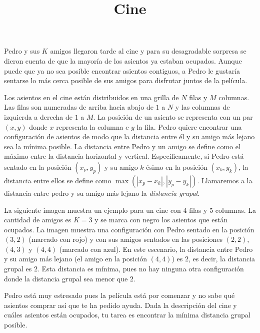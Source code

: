 \documentclass{oci}
\title{Cine}
\newcommand{\cine}{
    \fill[black] (1,3) rectangle (2,4);
    \fill[black] (2,3) rectangle (3,4);
    \fill[black] (3,3) rectangle (4,4);

    \fill[black] (0,2) rectangle (1,3);
    \fill[black] (3,2) rectangle (4,3);
    \fill[black] (4,2) rectangle (5,3);

    \fill[black] (0,1) rectangle (1,2);
    \fill[black] (1,1) rectangle (2,2);
    \fill[black] (2,1) rectangle (3,2);
    \fill[black] (4,1) rectangle (5,2);

    \fill[black] (2,0) rectangle (3,1);
    \fill[black] (4,0) rectangle (5,1);


    \foreach \x in {1, 2, 3, 4, 5} {
        \node[above] at (\x-1+0.5, 4) {\small\x};
    }
    \foreach \y in {1, 2, 3, 4} {
        \node[left] at (0, 4-\y+0.5) {\small\y};
    }
    \draw (0,0) grid (5,4);
}
\begin{document}
\begin{problemDescription}
    Pedro y sus $K$ amigos llegaron tarde al cine y
    para su desagradable sorpresa se dieron cuenta
    de que la mayoría de los asientos ya estaban ocupados.
    Aunque puede que ya no sea posible encontrar
    asientos contiguos, a Pedro le gustaría sentarse
    lo más cerca posible de sus amigos para disfrutar
    juntos de la película.

    Los asientos en el cine están distribuidos en una
    grilla de $N$ filas y $M$ columnas.
    Las filas son numeradas de arriba hacia abajo
    de $1$ a $N$ y las columnas de izquierda a derecha
    de $1$ a $M$.
    La posición de un asiento se representa con un par
    $(x, y)$ donde $x$ representa la columna e $y$ la fila.
    Pedro quiere encontrar una configuración de asientos
    de modo que la distancia entre él y su amigo más
    lejano sea la mínima posible.
    La distancia entre Pedro y un amigo se define
    como el máximo entre la distancia horizontal y vertical.
    Específicamente, si Pedro está sentado en la posición
    $(x_p, y_p)$ y su amigo $k$-ésimo en la posición
    $(x_k, y_k)$, la distancia entre ellos se define como
    $\max(|x_p - x_k|, |y_p - y_k|)$.
    Llamaremos a la distancia entre pedro y su amigo más
    lejano la \emph{distancia grupal}.

    La siguiente imagen muestra un ejemplo para un cine
    con $4$ filas y $5$ columnas.
    La cantidad de amigos es $K=3$ y se marca con negro
    los asientos que están ocupados.
    La imagen muestra una configuración con Pedro sentado en
    la posición $(3, 2)$ (marcado con {\color{pedro} rojo}) y
    con sus amigos sentados en las posiciones $(2, 2)$, $(4, 3)$ y $(4, 4)$
    (marcado con {\color{amigo} azul}).
    En este escenario, la distancia entre Pedro y su amigo
    más lejano (el amigo en la posición $(4, 4)$) es $2$,
    es decir, la distancia grupal es $2$.
    Esta distancia es mínima, pues no hay ninguna
    otra configuración donde la distancia grupal
    sea menor que $2$.

    \begin{figure}[h]
        \centering
    \end{figure}

    Pedro está muy estresado pues la película está por comenzar y
    no sabe qué asientos comprar así que te ha pedido ayuda.
    Dada la descripción del cine y cuáles asientos están ocupados,
    tu tarea es encontrar la mínima distancia grupal posible.

\end{problemDescription}
\end{document}
